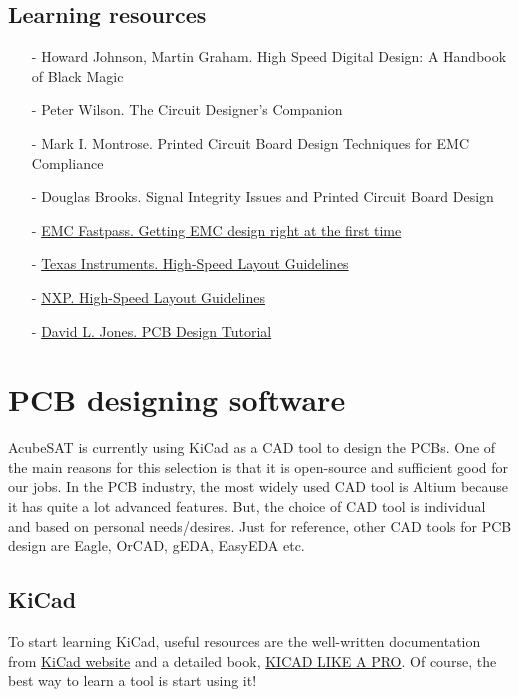 \documentclass[final]{cubedoc}
\begin{document}
	\subsection{Learning resources}
	\begin{itemize}
		\item[-] Howard Johnson, Martin Graham. High Speed Digital Design: A Handbook of Black Magic 
		\item[-] Peter Wilson. The Circuit Designer's Companion
		\item[-] Mark I. Montrose. Printed Circuit Board Design Techniques for EMC Compliance 
		\item[-] Douglas Brooks. Signal Integrity Issues and Printed Circuit Board Design
		\item[-] \href{https://drive.google.com/file/d/1C4cFAzJpTlKedcgKvlWDQnTaCCgdo58s/view?usp=sharing}{EMC Fastpass. Getting EMC design right at the first time}
		\item[-] \href{https://drive.google.com/file/d/1mr8UNMDeXmdCBnOVq22b1YUi3WwKNUMm/view?usp=sharing}{Texas Instruments. High-Speed Layout Guidelines}
		\item[-] \href{    https://drive.google.com/file/d/1gwrVG8WULKCOxYYrVLvCCZh1-luvQacq/view?usp=sharing}{NXP. High-Speed Layout Guidelines}
		\item[-] \href{https://drive.google.com/file/d/1ylptbGbczsr2scbjPCba7q4J1PiyvQL8/view?usp=sharing}{David L. Jones. PCB Design Tutorial}
		
	\end{itemize}
	
	\section{PCB designing software}
	
	AcubeSAT is currently using KiCad as a CAD tool to design the PCBs. One of the main reasons for this selection is that it is open-source and sufficient good for our jobs. In the PCB industry, the most widely used CAD tool is Altium because it has quite a lot advanced features. But, the choice of CAD tool is individual and based on personal needs/desires. Just for reference, other CAD tools for PCB design are Eagle, OrCAD, gEDA, EasyEDA etc.
	
	
	\subsection{KiCad}
	
	To start learning KiCad, useful resources are the well-written documentation from \href{http://docs.kicad-pcb.org/}{KiCad website} and a detailed book, \href{https://drive.google.com/file/d/1z3XU2MWJjkBjeA_4xKuLXPgRW0tIhxVv/view?usp=sharing}{KICAD LIKE A PRO}. Of course, the best way to learn a tool is start using it!
	
\end{document}
